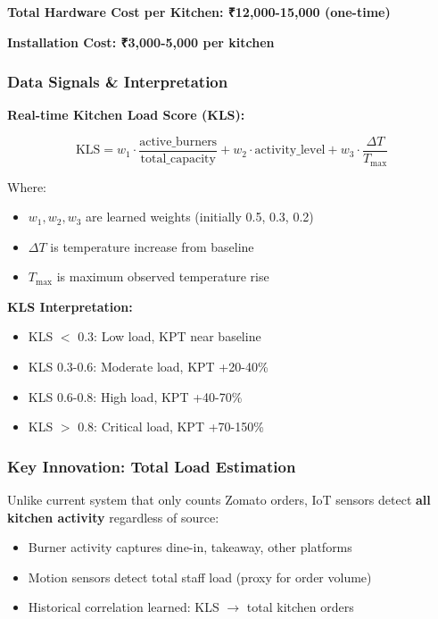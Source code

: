 \documentclass[11pt,a4paper]{article}
\begin{document}
\textbf{Total Hardware Cost per Kitchen: ₹12,000-15,000 (one-time)}

\textbf{Installation Cost: ₹3,000-5,000 per kitchen}

\subsubsection{Data Signals \& Interpretation}

\textbf{Real-time Kitchen Load Score (KLS):}

$$\text{KLS} = w_1 \cdot \frac{\text{active\_burners}}{\text{total\_capacity}} + w_2 \cdot \text{activity\_level} + w_3 \cdot \frac{\Delta T}{T_{\text{max}}}$$

Where:
\begin{itemize}
    \item $w_1, w_2, w_3$ are learned weights (initially 0.5, 0.3, 0.2)
    \item $\Delta T$ is temperature increase from baseline
    \item $T_{\text{max}}$ is maximum observed temperature rise
\end{itemize}

\textbf{KLS Interpretation:}
\begin{itemize}
    \item KLS $<$ 0.3: Low load, KPT near baseline
    \item KLS 0.3-0.6: Moderate load, KPT +20-40\%
    \item KLS 0.6-0.8: High load, KPT +40-70\%
    \item KLS $>$ 0.8: Critical load, KPT +70-150\%
\end{itemize}

\subsubsection{Key Innovation: Total Load Estimation}

Unlike current system that only counts Zomato orders, IoT sensors detect \textbf{all kitchen activity} regardless of source:

\begin{itemize}[leftmargin=*]
    \item Burner activity captures dine-in, takeaway, other platforms
    \item Motion sensors detect total staff load (proxy for order volume)
    \item Historical correlation learned: KLS $\rightarrow$ total kitchen orders
\end{itemize}
\end{document}
